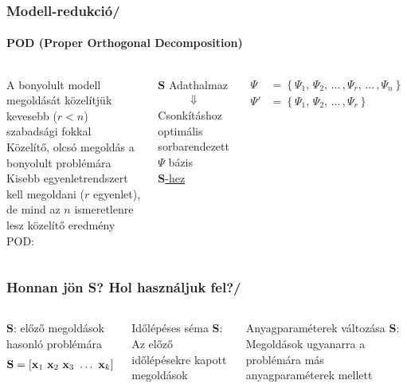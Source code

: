 \documentclass[aspectratio=43]{beamer}
\newcommand{\numframetitle}[1]{\frametitle{#1\hfill\insertframenumber/\insertpresentationendpage\hspace{-\fill}}}
\begin{document}
\begin{frame}
	\numframetitle{Modell-redukció}
    \framesubtitle{POD (Proper Orthogonal Decomposition)}
	\begin{columns}
            A bonyolult modell megoldását közelítjük kevesebb ($r< n$) szabadsági fokkal\\[3ex]
            Közelítő, olcsó megoldás a bonyolult problémára\\[3ex]
            Kisebb egyenletrendszert kell megoldani ($r$ egyenlet), de mind az $n$ ismeretlenre lesz közelítő eredmény
            POD:\\[3ex]
            \begin{center}
                $\mathbf{S}$ Adathalmaz
                \begin{align*}
                    \Downarrow
                \end{align*}
                Csonkításhoz optimális\\ sorbarendezett $\Psi$ bázis\\[1ex] \Large\underline{$\mathbf{S}$-hez}\normalsize
            \end{center}
            \begin{align*}
                \Psi &= \left\{ \Psi_1,\,\Psi_2,\,...\,,\Psi_r,\,...\,,\Psi_n\right\}\\
                \Psi' &= \left\{ \Psi_1,\,\Psi_2,\,...\,,\Psi_r\right\}
            \end{align*}
	\end{columns}
\end{frame}
\begin{frame}
	\numframetitle{Honnan jön \textbf{S}? Hol használjuk fel?}
        \begin{columns}
                \textbf{S}: előző megoldások hasonló problémára
                \begin{align*}
                    {\bf S} = \left[ {\bf x}_1~{\bf x}_2~{\bf x}_3~\hdots~{\bf x}_k \right] 
                \end{align*}
                \begin{block}{Időlépéses séma}
                    \textbf{S}: Az előző időlépésekre kapott megoldások
                \end{block}
                \vspace{1.5cm}
                \begin{block}{Anyagparaméterek változása}
                    \textbf{S}: Megoldások ugyanarra a problémára más anyagparaméterek mellett
                \end{block}
        \end{columns}
\end{frame}
\end{document}
